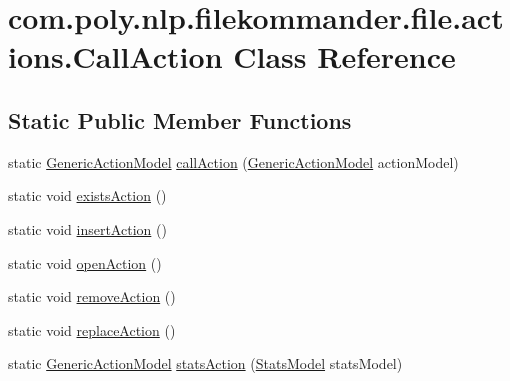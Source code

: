 \hypertarget{classcom_1_1poly_1_1nlp_1_1filekommander_1_1file_1_1actions_1_1_call_action}{\section{com.\-poly.\-nlp.\-filekommander.\-file.\-actions.\-Call\-Action Class Reference}
\label{classcom_1_1poly_1_1nlp_1_1filekommander_1_1file_1_1actions_1_1_call_action}
}
\subsection*{Static Public Member Functions}
\begin{DoxyCompactItemize}
\item 
static \hyperlink{interfacecom_1_1poly_1_1nlp_1_1filekommander_1_1views_1_1models_1_1_generic_action_model}{Generic\-Action\-Model} \hyperlink{classcom_1_1poly_1_1nlp_1_1filekommander_1_1file_1_1actions_1_1_call_action_a0e736328e4851dfb78f0578dd0414029}{call\-Action} (\hyperlink{interfacecom_1_1poly_1_1nlp_1_1filekommander_1_1views_1_1models_1_1_generic_action_model}{Generic\-Action\-Model} action\-Model)
\item 
static void \hyperlink{classcom_1_1poly_1_1nlp_1_1filekommander_1_1file_1_1actions_1_1_call_action_aa13dda5197a227b0ccd0a742668ec861}{exists\-Action} ()
\item 
static void \hyperlink{classcom_1_1poly_1_1nlp_1_1filekommander_1_1file_1_1actions_1_1_call_action_ad1eda2fa13b7a6902c45e898cdee1e2f}{insert\-Action} ()
\item 
static void \hyperlink{classcom_1_1poly_1_1nlp_1_1filekommander_1_1file_1_1actions_1_1_call_action_a82b3550337442d231288438a479993b9}{open\-Action} ()
\item 
static void \hyperlink{classcom_1_1poly_1_1nlp_1_1filekommander_1_1file_1_1actions_1_1_call_action_a00509e9811e6faf029a136227ad9c4b6}{remove\-Action} ()
\item 
static void \hyperlink{classcom_1_1poly_1_1nlp_1_1filekommander_1_1file_1_1actions_1_1_call_action_ac199f9c573025af0f871315ea997beaa}{replace\-Action} ()
\item 
static \hyperlink{interfacecom_1_1poly_1_1nlp_1_1filekommander_1_1views_1_1models_1_1_generic_action_model}{Generic\-Action\-Model} \hyperlink{classcom_1_1poly_1_1nlp_1_1filekommander_1_1file_1_1actions_1_1_call_action_a2668fbc0bf50bdf3b09853f2d88d8a9d}{stats\-Action} (\hyperlink{classcom_1_1poly_1_1nlp_1_1filekommander_1_1views_1_1models_1_1_stats_model}{Stats\-Model} stats\-Model)
\end{DoxyCompactItemize}
